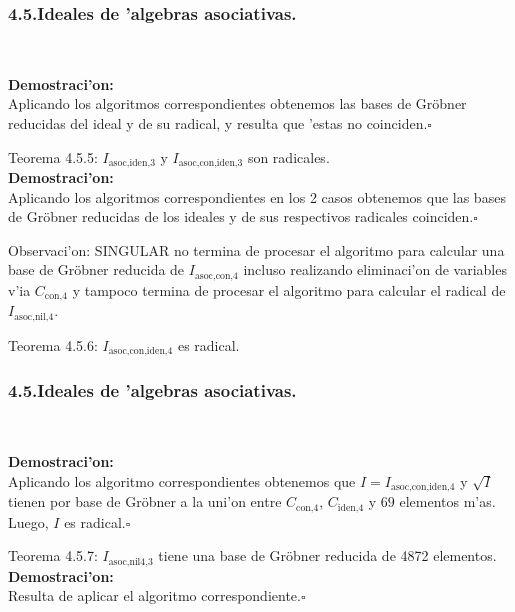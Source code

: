 \documentclass[10pt]{beamer}
\begin{document}
\begin{frame}
\frametitle{4.5.Ideales de 'algebras asociativas.}\\
\begin{block}{}
\textbf{Demostraci'on:}\\
Aplicando los algoritmos correspondientes obtenemos las bases de Gr\"obner reducidas del ideal y de su radical, y resulta que 'estas no coinciden.\hfill $\square$\end{block}
\begin{block}{Teorema 4.5.5:}
$I_{\text{asoc,iden,}3}$ y $I_{\text{asoc,con,iden,}3}$ son radicales.\\
\textbf{Demostraci'on:}\\
Aplicando los algoritmos correspondientes en los 2 casos obtenemos que las bases de Gr\"obner reducidas de los ideales y de sus respectivos radicales coinciden.\hfill $\square$\\
\end{block}
\begin{block}{Observaci'on:}
SINGULAR no termina de procesar el algoritmo para calcular una base de Gr\"obner reducida de $I_{\text{asoc,con,}4}$ incluso realizando eliminaci'on de variables v'ia $C_{\text{con,}4}$ y tampoco termina de procesar el algoritmo para calcular el radical de $I_{\text{asoc,nil,}4}$.\\
\end{block}
\begin{block}{Teorema 4.5.6:}
$I_{\text{asoc,con,iden,}4}$ es radical.\\
\end{block}
\vspace{4cm}
\end{frame}

\begin{frame}
\frametitle{4.5.Ideales de 'algebras asociativas.}\\
\begin{block}{}
\textbf{Demostraci'on:}\\
Aplicando los algoritmo correspondientes obtenemos que  $I=I_{\text{asoc,con,iden,}4}$ y $\sqrt{I}$ tienen por base de Gr\"obner a la uni'on entre $C_{\text{con,}4}$, $C_{\text{iden,}4}$ y $69$ elementos m'as. Luego, $I$ es radical.\hfill $\square$\\
\end{block}
\begin{block}{Teorema 4.5.7:}
$I_{\text{asoc,nil4,}3}$ tiene una base de Gr\"obner reducida de 4872 elementos.\\
\textbf{Demostraci'on:}\\
Resulta de aplicar el algoritmo correspondiente.\hfill $\square$\\
\end{block}
\vspace{5cm}
\end{frame}
\end{document}

